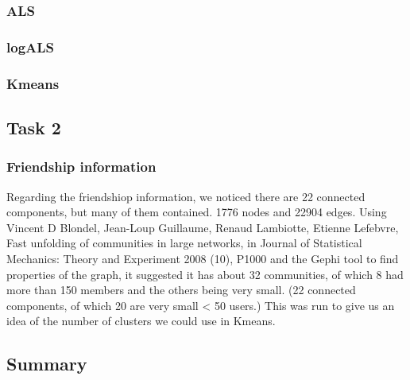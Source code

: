 \subsubsection{ALS}

\subsubsection{logALS}
\subsubsection{Kmeans}

\subsection{Task 2}
\subsubsection{Friendship information}
Regarding the friendshiop information, we noticed there are 22 connected components, but many of them contained.
1776 nodes and 22904 edges.
Using Vincent D Blondel, Jean-Loup Guillaume, Renaud Lambiotte, Etienne Lefebvre, Fast unfolding of communities in large networks, in Journal of Statistical Mechanics: Theory and Experiment 2008 (10), P1000 and the Gephi tool to find properties of the graph, it suggested it has about
32 communities, of which 8 had more than 150 members and the others being very small. (22 connected components, of which 20 are very small < 50 users.) This was run to give us an idea of the number of clusters we could use in Kmeans.


\subsection{Summary}



